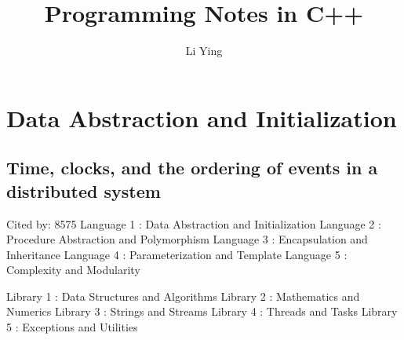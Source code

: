 \documentclass[a4paper,11pt]{article}
\author{Li Ying}
\title{Programming Notes in C++}
\begin{document}
\maketitle

\section*{Data Abstraction and Initialization}

\subsection*{Time, clocks, and the ordering of events in a distributed system}
{\color{cyan} {\color{magenta} Cited by: 8575}
Language 1 : Data Abstraction and Initialization
Language 2 : Procedure Abstraction and Polymorphism
Language 3 : Encapsulation and Inheritance
Language 4 : Parameterization and Template
Language 5 : Complexity and Modularity

Library 1 : Data Structures and Algorithms
Library 2 : Mathematics and Numerics
Library 3 : Strings and Streams
Library 4 : Threads and Tasks
Library 5 : Exceptions and Utilities
}

%
\end{document}
